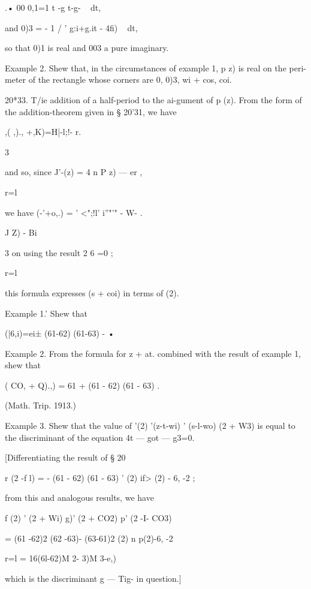 {.• 00 
0,1=1   t -g t-g- ~ dt, 

and 0)3 = - 1 / '  g:i+g.it - 4fi) ~   dt, 

so that 0)1 is real and 003 a pure imaginary. 

Example 2. Shew that, in the circumstances of example 1, p  z) is real on the peri- 
meter of the rectangle whose corners are 0, 0)3, wi + cos, coi. 

20*33. T/ie addition of a half-period to the ai-gument of p (z). 
From the form of the addition-theorem given in § 20'31, we have 



,(  ,)., +,K)=H|-l;!- r. 



3 



and so, since  J'-(z) = 4 n  P z) — er , 



r=l 

we have  (-'+o,.) = ' <";!l' i''"'" -  W- . 

 J  Z) - Bi 

3 
on using the result 2 6 =0 ; 

r=l 

this formula expresses   (s + coi) in terms of  (2). 

Example 1.' Shew that 

  (|6,i)=ei±  (61-62) (61-63) - • 

Example 2. From the formula for   z + at.  combined with the result of example 1, 
shew that 

  ( CO, + Q).,) = 61 +  (61 - 62) (61 - 63)   . 

(Math. Trip. 1913.) 

Example 3. Shew that the value of  '(2)  '(z-t-wi)  ' (s-l-wo)   (2 + W3) is equal to 
the discriminant of the equation 4t  — got — g3=0. 

[Differentiating the result of § 20%

r (2 -f  l) = - (61 - 62) (61 - 63)  ' (2)  if> (2) - 6, -2 ; 

from this and analogous results, we have 

f (2)  ' (2 + Wi) g)' (2 + CO2) p' (2 -I- CO3) 

= (61 -62)2 (62 -63)-  (63-61)2 (2) n  p(2)-6, -2 

r=l 
= 16(6l-62)M 2- 3)M 3-e,)  

which is the discriminant g  — Tig-  in question.] 



}
